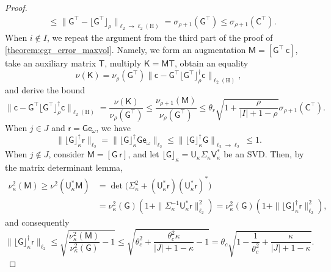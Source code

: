 \documentclass[onefignum,onetabnum]{siamart250211}
\renewenvironment{equation*}{\[}{\]\ignorespacesafterend}
\newcommand{\Hilb}{\mathrm{H}}
\newcommand{\Batrix}[1]{\bm{\Matrix{#1}}}
\newcommand{\Matrix}[1]{\mathsf{#1}}
\newcommand{\trans}{\intercal}
\newcommand{\pinv}{\dagger}
\newcommand{\truncate}[3][]{#1\lfloor #2 #1\rfloor_{#3}}
\newcommand{\Index}[1]{{#1}}
\newcommand{\Norm}[3][]{#1\| #2 #1\|_{\mathrm{#3}}}
\begin{document}
\begin{proof}
\begin{align*}
    &\leq \Norm{\Batrix{G}^\trans - \truncate{\Batrix{G}^\trans}{\rho}}{\ell_2 \to \ell_2(\Hilb)} = \sigma_{\rho + 1}(\Batrix{G}^\trans) \leq \sigma_{\rho + 1}(\Batrix{C}^\trans).
\end{align*}
When $i \not\in \Index{I}$, we repeat the argument from the third part of the proof of \cref{theorem:cgr_error_maxvol}.
Namely, we form an augmentation $\Batrix{M} = [\Batrix{G}^\trans~\Batrix{c}]$, take an auxiliary matrix $\Matrix{T}$, multiply $\Batrix{K} = \Batrix{M} \Matrix{T}$, obtain an equality
\begin{equation*}
    \nu(\Batrix{K}) = \nu_{\rho}(\Batrix{G}^{\trans}) \Norm{\Batrix{c} - \Batrix{G}^\trans \truncate{\Batrix{G}^\trans}{\rho}^\pinv \Batrix{c}}{\ell_2(\Hilb)},
\end{equation*}
and derive the bound
\begin{equation*}
   \Norm{\Batrix{c} - \Batrix{G}^\trans \truncate{\Batrix{G}^\trans}{\rho}^\pinv \Batrix{c}}{\ell_2(\Hilb)} = \frac{\nu(\Batrix{K})}{\nu_{\rho}(\Batrix{G}^{\trans})} \leq \frac{\nu_{\rho + 1}(\Batrix{M})}{\nu_{\rho}(\Batrix{G}^{\trans})} \leq  \theta_r \sqrt{1 + \frac{\rho}{|\Index{I}| + 1 - \rho}} \sigma_{\rho + 1}(\Batrix{C}^\trans).
\end{equation*}
When $j \in \Index{J}$ and $\Batrix{r} = \Batrix{G} \Matrix{e}_{\omega}$, we have
\begin{equation*}
    \Norm{\truncate{\Batrix{G}}{\kappa}^\pinv \Batrix{r}}{\ell_2} = \Norm{\truncate{\Batrix{G}}{\kappa}^\pinv \Batrix{G} \Matrix{e}_{\omega}}{\ell_2} \leq \Norm{\truncate{\Batrix{G}}{\kappa}^\pinv \Batrix{G}}{\ell_2 \to \ell_2} \leq 1.
\end{equation*}
When $j \not\in \Index{J}$, consider $\Batrix{M} = [\Batrix{G}~\Batrix{r}]$, and let $\truncate{\Batrix{G}}{\kappa} = \Batrix{U}_\kappa \Matrix{\Sigma}_\kappa \Matrix{V}_\kappa^\ast$ be an SVD.
Then, by the matrix determinant lemma,
\begin{align*}
    \nu_\kappa^2(\Batrix{M}) \geq \nu^2(\Batrix{U}_\kappa^\ast \Batrix{M}) &= \det\Big( \Matrix{\Sigma}_\kappa^2 + (\Batrix{U}_\kappa^\ast \Batrix{r}) (\Batrix{U}_\kappa^\ast \Batrix{r})^\ast \Big) \\
    &= \nu_\kappa^2(\Batrix{G}) (1 + \Norm{\Matrix{\Sigma}_\kappa^{-1} \Batrix{U}_\kappa^\ast \Batrix{r}}{\ell_2}^2) = \nu_\kappa^2(\Batrix{G}) (1 + \Norm{\truncate{\Batrix{G}}{\kappa}^\pinv \Batrix{r}}{\ell_2}^2),
\end{align*}
and consequently
\begin{equation*}
    \Norm{\truncate{\Batrix{G}}{\kappa}^\pinv \Batrix{r}}{\ell_2} \leq \sqrt{\frac{\nu_\kappa^2(\Batrix{M})}{\nu_\kappa^2(\Batrix{G})} - 1} \leq \sqrt{\theta_c^2 + \frac{\theta_c^2 \kappa}{|\Index{J}| + 1 - \kappa} - 1} = \theta_c \sqrt{1 - \frac{1}{\theta_c^2} + \frac{\kappa}{|\Index{J}| + 1 - \kappa}}.
\end{equation*}
\end{proof}
\end{document}
